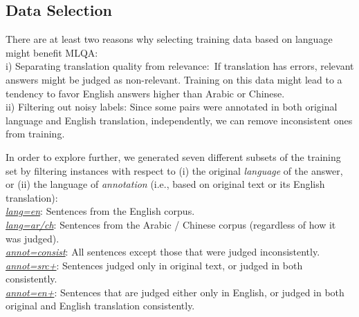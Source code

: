 \documentclass{sig-alternate-05-2015}
\begin{document}
\subsection{Data Selection} \label{sec:data}
There are at least two reasons why selecting training data based on language might benefit MLQA:\\
i) Separating translation quality from relevance:\ If translation has errors, relevant answers might 
be judged as non-relevant. Training on this data might lead to a tendency to favor 
English answers higher than Arabic or Chinese.\\
ii) Filtering out noisy labels: 
Since some pairs were annotated in both original language and English translation, independently, we can remove 
inconsistent ones from training.

In order to explore further, we generated seven different subsets of the training set by filtering instances with respect to (i) the 
original \emph{language} of the answer, or (ii) the language of \emph{annotation} (i.e., based on original text or its
English translation):\\
\underline{\em lang=en}: Sentences from the English corpus.\\
\underline{\em  lang=ar/ch}: Sentences from the Arabic / Chinese corpus (regardless of how it was judged).\\
\underline{\em annot=consist}: All sentences except those that were judged inconsistently.\\
\underline{\em annot=src+}: Sentences judged only in original text, or judged in both consistently.\\
\underline{\em  annot=en+}: Sentences that are judged either only in English, or judged in both original and English translation consistently.\\
\vspace{-0.35cm}

\end{document}
